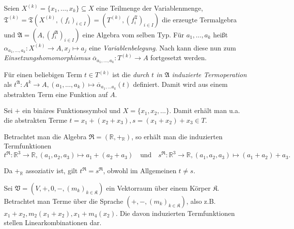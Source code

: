 \vspace*{-\lineskip}

\begin{definition}
    Seien $X^{(k)} = \{x_1, \ldots, x_k\} \subseteq X$ eine Teilmenge der Variablenmenge, $\mathfrak{T}^{(k)} = \mathfrak{T}(X^{(k)}, (f_i)_{i \in I}) = (T^{(k)}, (f_i^\mathfrak{T})_{i \in I})$ die erzeugte Termalgebra und $\mathfrak{A} = (A, (f_i^\mathfrak{A})_{i \in I})$ eine Algebra vom selben Typ. Für $a_1, \ldots, a_k$ heißt $\alpha_{a_1, \ldots, a_k}: X^{(k)} \to A, x_j \mapsto a_j$ eine \emph{Variablenbelegung}. Nach  kann diese nun zum \emph{Einsetzungshomomorphismus} $\overline{\alpha}_{a_1, \ldots, a_k}: T^{(k)} \to A$ fortgesetzt werden.

    Für einen beliebigen Term $t \in T^{(k)}$ ist die \emph{durch $t$ in $\mathfrak{A}$ induzierte Termoperation} als $t^\mathfrak{A}: A^k \to A, (a_1, \ldots, a_k) \mapsto \overline{\alpha}_{a_1, \ldots a_k}(t)$ definiert. Damit wird aus einem abstrakten Term eine Funktion auf $A$.
\end{definition}

\begin{example}
    Sei $+$ ein binäres Funktionssymbol und $X = \{x_1, x_2, \ldots \}$. Damit erhält man u.a. die abstrakten Terme $t = x_1 + (x_2 + x_3), s = (x_1 + x_2) + x_3 \in T$.

    Betrachtet man die Algebra $\mathfrak{R} = (\mathbb{R}, +_\mathbb{R})$, so erhält man die induzierten Termfunktionen $$t^\mathfrak{R}: \mathbb{R}^3 \to \mathbb{R}, (a_1, a_2, a_3) \mapsto a_1 + (a_2 + a_3) \quad \text{und} \quad s^\mathfrak{R}: \mathbb{R}^3 \to \mathbb{R}, (a_1, a_2, a_3) \mapsto (a_1 + a_2) + a_3.$$

    Da $+_\mathbb{R}$ assoziativ ist, gilt $t^\mathfrak{R} = s^\mathfrak{R}$, obwohl im Allgemeinen $t \neq s$.
\end{example}

\begin{example}
    Sei $\mathfrak{V} = (V, +, 0, -, (m_k)_{k \in \mathfrak{K}})$ ein Vektorraum über einem Körper $\mathfrak{K}$. Betrachtet man Terme über die Sprache $(+, -, (m_k)_{k \in \mathfrak{K}})$, also z.B. $x_1 + x_2, m_2(x_1 + x_2), x_1 + m_4(x_2)$. Die davon induzierten Termfunktionen stellen Linearkombinationen dar.
\end{example}
